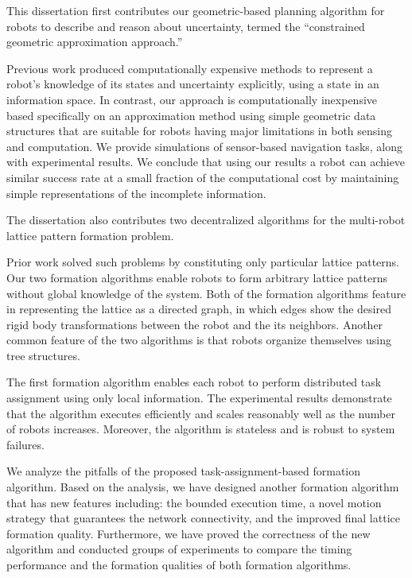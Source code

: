 This dissertation first contributes our geometric-based planning algorithm
for robots to describe and reason about
uncertainty, termed the ``constrained geometric approximation approach.''

Previous work produced computationally expensive methods to represent a robot's
knowledge of its states and uncertainty explicitly, using a state in
an information space. 
%
In contrast, our approach is computationally inexpensive based
specifically on an approximation method using simple geometric data structures 
that are suitable for robots 
having major limitations in both sensing and computation. 
%
We provide simulations of sensor-based navigation
tasks, along with experimental results.
%
We conclude that using our results a robot can achieve similar success rate at a small fraction of the computational cost
by maintaining simple representations of the incomplete information.
  
The dissertation also contributes two decentralized algorithms for the multi-robot
lattice pattern formation problem. 
% 

Prior work solved such problems by constituting only particular lattice patterns.
%
Our two formation algorithms enable robots to form arbitrary lattice patterns without global knowledge of the system.
%
Both of the formation algorithms feature in representing the lattice as
a directed graph, in which edges show the desired rigid body transformations
between the robot and the its neighbors. 
%
Another common feature of the two algorithms is that robots organize themselves using tree structures. 

The first formation algorithm enables each robot to perform distributed task assignment using
only local information.
%
The experimental results demonstrate that the algorithm executes efficiently and 
scales reasonably well as the number of robots increases.
Moreover, the algorithm is stateless and is robust to system failures.

We analyze the pitfalls of the proposed task-assignment-based formation algorithm.
Based on the analysis, we have designed another formation algorithm that has new features including:
the bounded execution time, a novel motion strategy that guarantees the network connectivity, 
and the improved final lattice formation quality.
%
Furthermore, we have proved the correctness of the new algorithm and 
conducted groups of experiments to compare the timing performance 
and the formation qualities of both formation algorithms.
